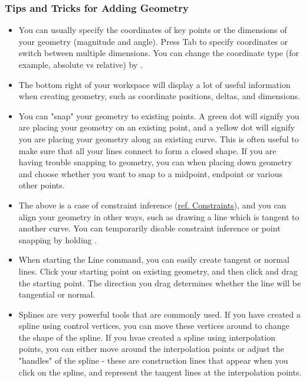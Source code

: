 \subsubsection{Tips and Tricks for Adding Geometry}
\begin{itemize}
    \item You can usually specify the coordinates of key points or the dimensions of your geometry (magnitude and angle). Press Tab to specify coordinates or switch between multiple dimensions. You can change the coordinate type (for example, absolute vs relative) by .
    \item The bottom right of your workspace will display a lot of useful information when creating geometry, such as coordinate positions, deltas, and dimensions.
    \item You can "snap" your geometry to existing points. A green dot will signify you are placing your geometry on an existing point, and a yellow dot will signify you are placing your geometry along an existing curve. This is often useful to make sure that all your lines connect to form a closed shape. If you are having trouble snapping to geometry, you can  when placing down geometry and choose whether you want to snap to a midpoint, endpoint or various other points.
    \item The above is a case of constraint inference (\hyperref[chap:constraints]{ref. Constraints}), and you can align your geometry in other ways, such as drawing a line which is tangent to another curve. You can temporarily disable constraint inference or point snapping by holding .
    \item When starting the Line command, you can easily create tangent or normal lines. Click your starting point on existing geometry, and then click and drag the starting point. The direction you drag determines whether the line will be tangential or normal.
    \item Splines are very powerful tools that are commonly used. If you have created a spline using control vertices, you can move these vertices around to change the shape of the spline. If you hvae created a spline using interpolation points, you can either move around the interpolation points or adjust the "handles" of the spline - these are construction lines that appear when you click on the spline, and represent the tangent lines at the interpolation points.
\end{itemize}


